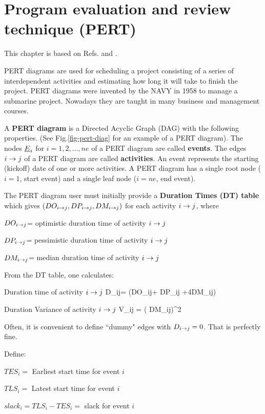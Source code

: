 \chapter{Program evaluation
 and review technique (PERT)}
This chapter is based on
Refs.\cite{ibook} and \cite{wiki-pert}.

PERT diagrams are 
used for scheduling a 
project consisting of a series
of interdependent activities
and estimating how
long it will take
to finish the project.
PERT diagrams were invented by the NAVY 
in 1958
to manage a submarine project.
Nowadays they are taught in many business 
and management courses.

A {\bf PERT diagram}
is a  Directed Acyclic Graph (DAG)
with the following properties. 
(See Fig.\ref{fig-pert-diag}
for an example of a PERT diagram).
The nodes ${\underline{E}}_i$ for $i=1, 2, \ldots, ne$ of a
PERT diagram are called {\bf events}.
 The edges $i\rightarrow j$ of a PERT diagram are called
 {\bf activities}.
An event represents the starting 
(kickoff) date of one or more
activities.
A PERT diagram has a 
single root node ($i=1$, start event)
and a single leaf node ($i=ne$, end event).

The PERT diagram user 
must initially 
provide a
{\bf Duration Times (DT) table} which gives $(DO_{i\rightarrow j}, 
DP_{i\rightarrow j}, DM_{i\rightarrow j})$ for each activity
$i\rightarrow j$, where

$DO_{i\rightarrow j}$= optimistic duration time 
of activity $i\rightarrow j$

$DP_{i\rightarrow j}$= pessimistic duration time 
of activity $i\rightarrow j$

$DM_{i\rightarrow j}$= median duration time 
of activity $i\rightarrow j$

From the DT table, one calculates:

Duration time of activity $i\rightarrow j$ 
\beq
D_{i\rarrow j}= (DO_{i\rarrow j}+
DP_{i\rarrow j} +4DM_{i\rarrow j})
\eeq

Duration Variance of activity $i\rightarrow j$
\beq
V_{i\rarrow j} = \left(
{DM_{i\rarrow j}}\right)^2
\eeq

Often,
it is convenient to define
``dummy" edges with $D_{i\rightarrow j}=0$.
That is perfectly fine.

Define:

$TES_i=$ Earliest start time for event $i$

$TLS_i=$ Latest start time for event $i$

$slack_i=TLS_i-TES_i=$ slack for event $i$

